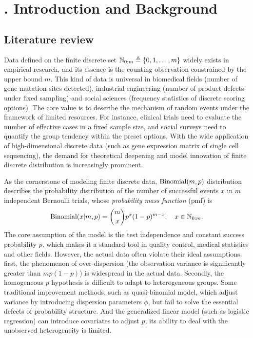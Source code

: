 
\section{$\!\!\!\!\!\!\!$. Introduction and Background}    %

\subsection{Literature review}      %

Data defined on the finite discrete set ${\mathbb{N}}_{0:m} \triangleq \{0, 1, \dots, m\}$ widely exists in empirical research, and its essence is the counting observation constrained by the upper bound $m$. This kind of data is universal in biomedical fields (number of gene mutation sites detected), industrial engineering (number of product defects under fixed sampling) and social sciences (frequency statistics of discrete scoring options). The core value is to describe the mechanism of random events under the framework of limited resources. For instance, clinical trials need to evaluate the number of effective cases in a fixed sample size, and social surveys need to quantify the group tendency within the preset options. With the wide application of high-dimensional discrete data (such as gene expression matrix of single cell sequencing), the demand for theoretical deepening and model innovation of finite discrete distribution is increasingly prominent.

As the cornerstone of modeling finite discrete data, $\mbox{Binomial}(m,p)$ distribution describes the probability distribution of the number of successful events $x$ in $m$ independent Bernoulli trials, whose \textit{probability mass function} (pmf) is
$$
   \mbox{Binomial}(x|m,p) = \binom{m}{x} p^x (1-p)^{m-x}, \quad x \in {\mathbb{N}}_{0:m}.
$$
The core assumption of the model is the test independence and constant success probability $p$, which makes it a standard tool in quality control, medical statistics and other fields. However, the actual data often violate their ideal assumptions: first, the phenomenon of over-dispersion (the observation variance is significantly greater than $mp(1-p)$) is widespread in the actual data. Secondly, the homogeneous $p$ hypothesis is difficult to adapt to heterogeneous groups. Some traditional improvement methods, such as quasi-binomial model, which adjust variance by introducing dispersion parameters $\phi$, but fail to solve the essential defects of probability structure. And the generalized linear model (such as logistic regression) can introduce covariates to adjust $p$, its ability to deal with the unobserved heterogeneity is limited.

